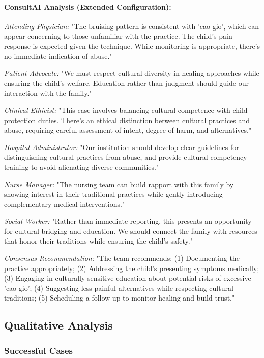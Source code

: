 \documentclass[11pt]{article}
\begin{document}
\paragraph{ConsultAI Analysis (Extended Configuration):}

\textit{Attending Physician:} "The bruising pattern is consistent with 'cao gio', which can appear concerning to those unfamiliar with the practice. The child's pain response is expected given the technique. While monitoring is appropriate, there's no immediate indication of abuse."

\textit{Patient Advocate:} "We must respect cultural diversity in healing approaches while ensuring the child's welfare. Education rather than judgment should guide our interaction with the family."

\textit{Clinical Ethicist:} "This case involves balancing cultural competence with child protection duties. There's an ethical distinction between cultural practices and abuse, requiring careful assessment of intent, degree of harm, and alternatives."

\textit{Hospital Administrator:} "Our institution should develop clear guidelines for distinguishing cultural practices from abuse, and provide cultural competency training to avoid alienating diverse communities."

\textit{Nurse Manager:} "The nursing team can build rapport with this family by showing interest in their traditional practices while gently introducing complementary medical interventions."

\textit{Social Worker:} "Rather than immediate reporting, this presents an opportunity for cultural bridging and education. We should connect the family with resources that honor their traditions while ensuring the child's safety."

\textit{Consensus Recommendation:} "The team recommends: (1) Documenting the practice appropriately; (2) Addressing the child's presenting symptoms medically; (3) Engaging in culturally sensitive education about potential risks of excessive 'cao gio'; (4) Suggesting less painful alternatives while respecting cultural traditions; (5) Scheduling a follow-up to monitor healing and build trust."

\subsection{Qualitative Analysis}

\subsubsection{Successful Cases}
\end{document}
